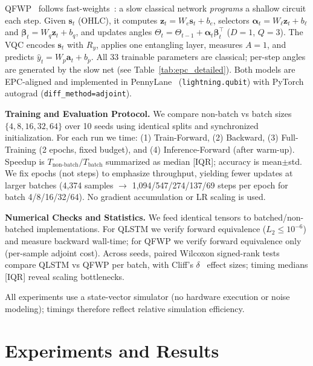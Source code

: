\documentclass{article}
\begin{document}
QFWP~\cite{chen2024learning} follows fast-weights~\cite{schmidhuber1992learning,ba2016using}: a slow classical network \emph{programs} a shallow circuit each step.
Given $\mathbf{s}_t$ (OHLC), it computes $\mathbf{z}_t=W_e\mathbf{s}_t+b_e$, selectors
$\boldsymbol{\alpha}_t=W_\ell\mathbf{z}_t+b_\ell$ and $\boldsymbol{\beta}_t=W_q\mathbf{z}_t+b_q$, and updates angles
$\Theta_t=\Theta_{t-1}+\boldsymbol{\alpha}_t\boldsymbol{\beta}_t^\top$ ($D=1$, $Q=3$).
The VQC encodes $\mathbf{s}_t$ with $R_y$, applies one entangling layer, measures $A=1$, and predicts $\hat{y}_t=W_p\mathbf{a}_t+b_p$.
All 33 trainable parameters are classical; per-step angles are generated by the slow net (see Table~\ref{tab:epc_detailed}).
Both models are EPC-aligned and implemented in PennyLane~\cite{bergholm2018pennylane} (\texttt{lightning.qubit}) with PyTorch~\cite{paszke2019pytorch} autograd (\texttt{diff\_method=adjoint}).

\textbf{Training and Evaluation Protocol.}
We compare non-batch vs batch sizes $\{4,8,16,32,64\}$ over 10 seeds using identical splits and synchronized initialization.
For each run we time: (1) Train-Forward, (2) Backward, (3) Full-Training (2 epochs, fixed budget), and (4) Inference-Forward (after warm-up).
Speedup is $T_{\text{non-batch}}/T_{\text{batch}}$ summarized as median [IQR]; accuracy is mean$\pm$std.
We fix epochs (not steps) to emphasize throughput, yielding fewer updates at larger batches (4,374 samples $\rightarrow$ 1,094/547/274/137/69 steps per epoch for batch 4/8/16/32/64). No gradient accumulation or LR scaling is used.

\textbf{Numerical Checks and Statistics.}
We feed identical tensors to batched/non-batched implementations.
For QLSTM we verify forward equivalence ($L_2\le 10^{-6}$) and measure backward wall-time; for QFWP we verify forward equivalence only (per-sample adjoint cost).
Across seeds, paired Wilcoxon signed-rank tests~\cite{wilcoxon1945individual} compare QLSTM vs QFWP per batch, with Cliff's $\delta$~\cite{cliff1993dominance} effect sizes; timing medians [IQR] reveal scaling bottlenecks.

All experiments use a state-vector simulator (no hardware execution or noise modeling); timings therefore reflect relative simulation efficiency.


\section{Experiments and Results}
\label{sec:exp_and_res}
\end{document}

